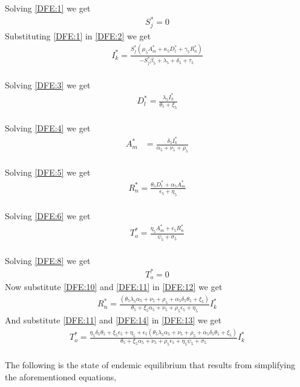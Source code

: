 \documentclass{article}
\begin{document}
Solving \ref{DFE:1} we get\\
\begin{align}
    S_j^*=0
\end{align}
Substituting \ref{DFE:1} in \ref{DFE:2} we get\\
\begin{align}
 I_k^* =\frac{S_j^*\left(\mu_5 A_m^* +\kappa_5 D_l^* + \gamma_5 R_n^*\right)}{-S_j^*\beta_5 + \lambda_5 + \delta_5 + \tau_5} \label{DFE:9}
\end{align}\\
Solving \ref{DFE:3} we get
\begin{align}
D_l^* = \frac{\lambda_5 I_k^*}{\theta_5 + \xi_5} \label{DFE:10}
\end{align}\\ 
Solving \ref{DFE:4} we get 
\begin{align}
A_m^*& = \frac{\delta_5 I_k^*}{\alpha_5 + \nu_5 + \rho_5}   \label{DFE:11}
\end{align}\\
Solving \ref{DFE:5} we get
\begin{align}
R_n^*=\frac{\theta_5 D_l^* + \alpha_5 A_m^*}{\epsilon_5 + \eta_5} \label{DFE:12}
\end{align}\\
Solving \ref{DFE:6} we get 
\begin{align}
    T_o^*=\frac{\eta_5 A_m^* + \epsilon_5 R_n^*}{\psi_5 + \sigma_5} \label{DFE:13}
\end{align}\\
Solving \ref{DFE:8} we get
\begin{align}
    T_o^*=0
\end{align}
Now substitute \ref{DFE:10} and \ref{DFE:11} in \ref{DFE:12} we get
\begin{align}
    R_n^*=\frac{\left(\theta_5 \lambda_5 \alpha_5 + \nu_5 + \rho_5 + \alpha_5 \delta_5 \theta_5 + \xi_5\right)}{\theta_5 + \xi_5 \alpha_5 + \nu_5 + \rho_5 \epsilon_5 + \eta_5}I_k^* \label{DFE:14}
\end{align}
And substitute \ref{DFE:11} and \ref{DFE:14} in \ref{DFE:13} we get
\begin{align}
    T_o^*= \frac{\eta_5 \delta_5 \theta_5 + \xi_5 \epsilon_5 + \eta_5 + \epsilon_5(\theta_5 \lambda_5 \alpha_5 + \nu_5 + \rho_5 + \alpha_5 \delta_5 \theta_5 + \xi_5)}{\theta_5 + \xi_5 \alpha_5 + \nu_5 + \rho_5 \epsilon_5 + \eta_5 \psi_5 + \sigma_5}I_k^*    
\end{align}\\
The following is the state of endemic equilibrium that results from simplifying the aforementioned equations,
\end{document}
